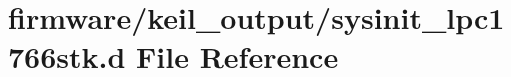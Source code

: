 \hypertarget{sysinit__lpc1766stk_8d}{\section{firmware/keil\-\_\-output/sysinit\-\_\-lpc1766stk.d File Reference}
\label{sysinit__lpc1766stk_8d}
}
